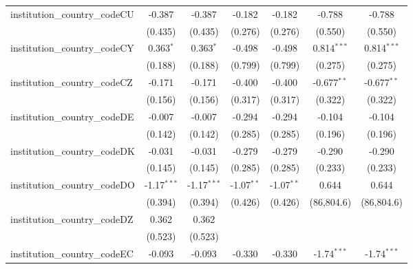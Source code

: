\begin{tabular}{lcccccc}
   institution\_country\_codeCU          & -0.387         & -0.387         & -0.182         & -0.182         & -0.788         & -0.788\\   
                                         & (0.435)        & (0.435)        & (0.276)        & (0.276)        & (0.550)        & (0.550)\\   
   institution\_country\_codeCY          & 0.363$^{*}$    & 0.363$^{*}$    & -0.498         & -0.498         & 0.814$^{***}$  & 0.814$^{***}$\\   
                                         & (0.188)        & (0.188)        & (0.799)        & (0.799)        & (0.275)        & (0.275)\\   
   institution\_country\_codeCZ          & -0.171         & -0.171         & -0.400         & -0.400         & -0.677$^{**}$  & -0.677$^{**}$\\   
                                         & (0.156)        & (0.156)        & (0.317)        & (0.317)        & (0.322)        & (0.322)\\   
   institution\_country\_codeDE          & -0.007         & -0.007         & -0.294         & -0.294         & -0.104         & -0.104\\   
                                         & (0.142)        & (0.142)        & (0.285)        & (0.285)        & (0.196)        & (0.196)\\   
   institution\_country\_codeDK          & -0.031         & -0.031         & -0.279         & -0.279         & -0.290         & -0.290\\   
                                         & (0.145)        & (0.145)        & (0.285)        & (0.285)        & (0.233)        & (0.233)\\   
   institution\_country\_codeDO          & -1.17$^{***}$  & -1.17$^{***}$  & -1.07$^{**}$   & -1.07$^{**}$   & 0.644          & 0.644\\   
                                         & (0.394)        & (0.394)        & (0.426)        & (0.426)        & (86,804.6)     & (86,804.6)\\   
   institution\_country\_codeDZ          & 0.362          & 0.362          &                &                &                &   \\   
                                         & (0.523)        & (0.523)        &                &                &                &   \\   
   institution\_country\_codeEC          & -0.093         & -0.093         & -0.330         & -0.330         & -1.74$^{***}$  & -1.74$^{***}$\\   

\end{tabular}
